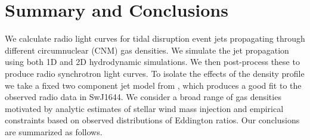 \documentclass[usenatbib,fleqn]{mnras}
\begin{document}
\section{Summary and Conclusions}
\label{sec:conc}

We calculate radio light curves for tidal disruption event jets
propagating through different circumnuclear (CNM) gas densities. We
simulate the jet propagation using both 1D and 2D hydrodynamic
simulations. We then post-process these to produce radio synchrotron
light curves. To isolate the effects of the density profile we take a
fixed two component jet model from \citet{Mimica+2015}, which produces
a good fit to the observed radio data in SwJ1644. We
consider a broad range of gas densities motivated by analytic
estimates of stellar wind mass injection and empirical constraints
based on observed distributions of Eddington ratios. Our conclusions
are summarized as follows.
\end{document}

